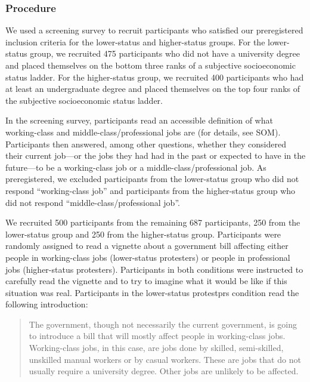 \documentclass[twocolumn, 11pt, letterpaper]{article}
\begin{document}
\hypertarget{procedure}{%
\subsubsection{Procedure}\label{procedure}}

We used a screening survey to recruit participants who satisfied our
preregistered inclusion criteria for the lower-status and higher-status
groups. For the lower-status group, we recruited 475 participants who
did not have a university degree and placed themselves on the bottom
three ranks of a subjective socioeconomic status ladder. For the
higher-status group, we recruited 400 participants who had at least an
undergraduate degree and placed themselves on the top four ranks of the
subjective socioeconomic status ladder.

In the screening survey, participants read an accessible definition of
what working-class and middle-class/professional jobs are (for details,
see SOM). Participants then answered, among other questions, whether
they considered their current job---or the jobs they had had in the past
or expected to have in the future---to be a working-class job or a
middle-class/professional job. As preregistered, we excluded
participants from the lower-status group who did not respond
``working-class job'' and participants from the higher-status group who
did not respond ``middle-class/professional job''.

We recruited 500 participants from the remaining 687 participants, 250
from the lower-status group and 250 from the higher-status group.
Participants were randomly assigned to read a vignette about a
government bill affecting either people in working-class jobs
(lower-status protesters) or people in professional jobs (higher-status
protesters). Participants in both conditions were instructed to
carefully read the vignette and to try to imagine what it would be like
if this situation was real. Participants in the lower-status protestprs
condition read the following introduction:

\begin{quote}
The government, though not necessarily the current government, is going
to introduce a bill that will mostly affect people in working-class
jobs. Working-class jobs, in this case, are jobs done by skilled,
semi-skilled, unskilled manual workers or by casual workers. These are
jobs that do not usually require a university degree. Other jobs are
unlikely to be affected.
\end{quote}
\end{document}
